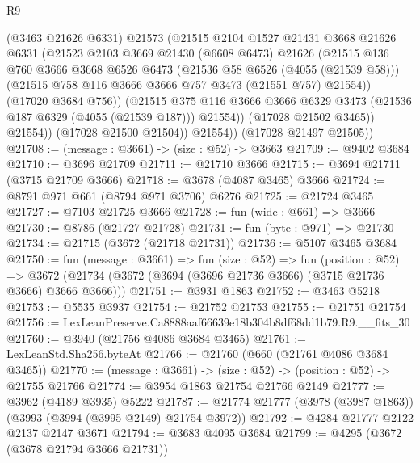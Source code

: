 \begin{lexlean}{R9}
\begin{coremodule}
                  (@3463 @21626 @6331)
                  @21573
                  (@21515
                    @2104
                    @1527
                    @21431
                    @3668
                    @21626
                    @6331
                    (@21523
                      @2103
                      @3669
                      @21430
                      (@6608 @6473)
                      @21626
                      (@21515
                        @136
                        @760
                        @3666
                        @3668
                        @6526
                        @6473
                        (@21536 @58 @6526 (@4055 (@21539 @58)))
                        (@21515 @758 @116 @3666 @3666 @757 @3473 (@21551 @757) @21554))
                      (@17020 @3684 @756))
                    (@21515
                      @375
                      @116
                      @3666
                      @3666
                      @6329
                      @3473
                      (@21536 @187 @6329 (@4055 (@21539 @187)))
                      @21554))
                  (@17028 @21502 @3465))
                @21554))
            (@17028 @21500 @21504))
          @21554))
      (@17028 @21497 @21505))
@21708 := (message : @3661) -> (size : @52) -> @3663
@21709 := @9402 @3684
@21710 := @3696 @21709
@21711 := @21710 @3666
@21715 := @3694 @21711 (@3715 @21709 @3666)
@21718 := @3678 (@4087 @3465) @3666
@21724 := @8791 @971 @661 (@8794 @971 @3706) @6276
@21725 := @21724 @3465
@21727 := @7103 @21725 @3666
@21728 := fun (wide : @661) => @3666
@21730 := @8786 (@21727 @21728)
@21731 := fun (byte : @971) => @21730
@21734 := @21715 (@3672 (@21718 @21731))
@21736 := @5107 @3465 @3684
@21750 := fun (message : @3661) =>
  fun (size : @52) =>
  fun (position : @52) =>
  @3672 (@21734 (@3672 (@3694 (@3696 @21736 @3666) (@3715 @21736 @3666) @3666 @3666)))
@21751 := @3931 @1863
@21752 := @3463 @5218
@21753 := @5535 @3937
@21754 := @21752 @21753
@21755 := @21751 @21754
@21756 := LexLeanPreserve.Ca8888aaf66639e18b304b8df68dd1b79.R9.__fits_30
@21760 := @3940 (@21756 @4086 @3684 @3465)
@21761 := LexLeanStd.Sha256.byteAt
@21766 := @21760 (@660 (@21761 @4086 @3684 @3465))
@21770 := (message : @3661) -> (size : @52) -> (position : @52) -> @21755 @21766
@21774 := @3954 @1863 @21754 @21766 @2149
@21777 := @3962 (@4189 @3935) @5222
@21787 := @21774 @21777 (@3978 (@3987 @1863)) (@3993 (@3994 (@3995 @2149) @21754 @3972))
@21792 := @4284 @21777 @2122 @2137 @2147 @3671
@21794 := @3683 @4095 @3684
@21799 := @4295 (@3672 (@3678 @21794 @3666 @21731))

\end{coremodule}
\end{lexlean}
